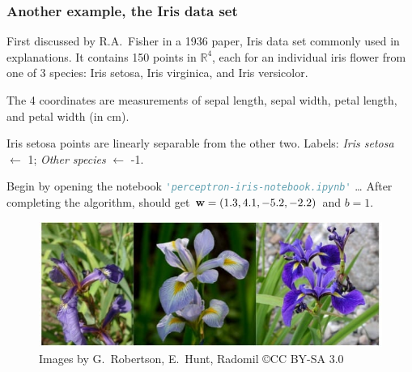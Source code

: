 \documentclass{beamer}
\theoremstyle{example}
\begin{document}
\begin{frame}
    \frametitle{Another example, the Iris data set}
    First discussed by R.A.\ Fisher in a 1936 paper, Iris data set commonly used in explanations. It contains 150 points in $\mathbb R^4$, each for an individual iris flower from one of 3 species: Iris setosa, Iris virginica, and Iris versicolor.

    The 4 coordinates are measurements of sepal length, sepal width, petal length, and petal width (in cm).

    Iris setosa points are linearly separable from the other two. \newline 
    Labels: \textit{Iris setosa} $\leftarrow$ 1; \textit{Other species} $\leftarrow$ -1.

    Begin by opening the notebook \lstinline[language=Python,stringstyle=\ttfamily\color{strings}]{'perceptron-iris-notebook.ipynb'} \ldots 
    After completing the algorithm, should get ${\bf w} = (1.3,4.1,-5.2,-2.2)$ and $b = 1$.

    \begin{figure}
    \includegraphics[height=0.2\textheight]{../../Images/iris-3species.jpg}
    \caption{Images by G.\ Robertson, E.\ Hunt, Radomil \copyright CC BY-SA 3.0}
    \end{figure}
\end{frame}
\end{document}
